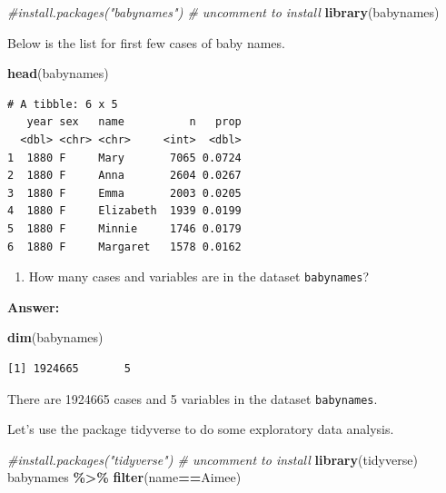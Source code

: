 \documentclass[
]{book}
\newenvironment{Shaded}{\begin{snugshade}}{\end{snugshade}}
\newcommand{\CommentTok}[1]{\textcolor[rgb]{0.56,0.35,0.01}{\textit{#1}}}
\newcommand{\FunctionTok}[1]{\textcolor[rgb]{0.13,0.29,0.53}{\textbf{#1}}}
\newcommand{\NormalTok}[1]{#1}
\newcommand{\SpecialCharTok}[1]{\textcolor[rgb]{0.81,0.36,0.00}{\textbf{#1}}}
\newcommand{\StringTok}[1]{\textcolor[rgb]{0.31,0.60,0.02}{#1}}
\providecommand{\tightlist}{%
  \setlength{\itemsep}{0pt}\setlength{\parskip}{0pt}}
\begin{document}
\begin{Shaded}
\begin{Highlighting}[]
\CommentTok{\#install.packages("babynames")  \# uncomment to install}
\FunctionTok{library}\NormalTok{(babynames)}
\end{Highlighting}
\end{Shaded}

Below is the list for first few cases of baby names.

\begin{Shaded}
\begin{Highlighting}[]
\FunctionTok{head}\NormalTok{(babynames)}
\end{Highlighting}
\end{Shaded}

\begin{verbatim}
# A tibble: 6 x 5
   year sex   name          n   prop
  <dbl> <chr> <chr>     <int>  <dbl>
1  1880 F     Mary       7065 0.0724
2  1880 F     Anna       2604 0.0267
3  1880 F     Emma       2003 0.0205
4  1880 F     Elizabeth  1939 0.0199
5  1880 F     Minnie     1746 0.0179
6  1880 F     Margaret   1578 0.0162
\end{verbatim}

\begin{enumerate}
\def\labelenumi{\arabic{enumi}.}
\tightlist
\item
  How many cases and variables are in the dataset \texttt{babynames}?
\end{enumerate}

\textbf{Answer:}

\begin{Shaded}
\begin{Highlighting}[]
\FunctionTok{dim}\NormalTok{(babynames)}
\end{Highlighting}
\end{Shaded}

\begin{verbatim}
[1] 1924665       5
\end{verbatim}

There are 1924665 cases and 5 variables in the dataset \texttt{babynames}.

Let's use the package tidyverse to do some exploratory data analysis.

\begin{Shaded}
\begin{Highlighting}[]
\CommentTok{\#install.packages("tidyverse")   \# uncomment to install}
\FunctionTok{library}\NormalTok{(tidyverse)}
\NormalTok{babynames }\SpecialCharTok{\%\textgreater{}\%} \FunctionTok{filter}\NormalTok{(name}\SpecialCharTok{==}\StringTok{\textquotesingle{}Aimee\textquotesingle{}}\NormalTok{)}
\end{Highlighting}
\end{Shaded}
\end{document}
